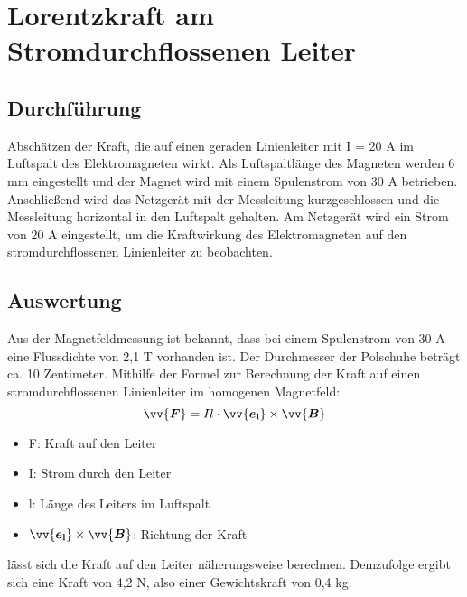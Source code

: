\documentclass[a4paper,twoside,12pt,DIV=13,BCOR=5mm,numbers=noenddot,cleardoublepage=empty]{scrbook}
\begin{document}
    \section{Lorentzkraft am Stromdurchflossenen Leiter}
        \subsection{Durchf\"uhrung}
        Absch\"atzen der Kraft, die auf einen geraden Linienleiter mit I = 20 A im Luftspalt des Elektromagneten wirkt.
        Als Luftspaltl\"ange des Magneten werden 6 mm eingestellt und der Magnet wird mit einem Spulenstrom von 30 A betrieben.
        Anschlie\ss{}end wird das Netzger\"at mit der Messleitung kurzgeschlossen und die Messleitung horizontal in den Luftspalt gehalten. Am Netzger\"at wird ein Strom von 20 A eingestellt, um die Kraftwirkung des Elektromagneten auf den stromdurchflossenen Linienleiter zu beobachten.
        \subsection{Auswertung}
        Aus der Magnetfeldmessung ist bekannt, dass bei einem Spulenstrom von 30 A eine Flussdichte von 2,1 T vorhanden ist. Der Durchmesser der Polschuhe betr\"agt ca. 10 Zentimeter. 
        Mithilfe der Formel zur Berechnung der Kraft auf einen stromdurchflossenen Linienleiter im homogenen Magnetfeld: 
        \begin{equation}
            \vv{\bm{F}} = Il \cdot \vv{\bm{e_\mathrm{l}}} \times \vv{\bm{B}}
        \end{equation}
        \begin{itemize}
            \item F: Kraft auf den Leiter
            \item I: Strom durch den Leiter
            \item l: L\"ange des Leiters im Luftspalt
            \item $\vv{\bm{e_\mathrm{l}}} \times \vv{\bm{B}}$: Richtung der Kraft
        \end{itemize}
        l\"asst sich die Kraft auf den Leiter n\"aherungsweise berechnen. Demzufolge ergibt sich eine Kraft von 4,2 N, also einer Gewichtskraft von 0,4 kg.
\listoffigures
\end{document}
